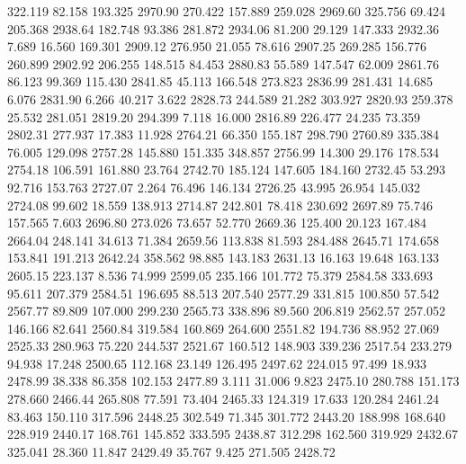  322.119   82.158  193.325      2970.90
 270.422  157.889  259.028      2969.60
 325.756   69.424  205.368      2938.64
 182.748   93.386  281.872      2934.06
  81.200   29.129  147.333      2932.36
   7.689   16.560  169.301      2909.12
 276.950   21.055   78.616      2907.25
 269.285  156.776  260.899      2902.92
 206.255  148.515   84.453      2880.83
  55.589  147.547   62.009      2861.76
  86.123   99.369  115.430      2841.85
  45.113  166.548  273.823      2836.99
 281.431   14.685    6.076      2831.90
   6.266   40.217    3.622      2828.73
 244.589   21.282  303.927      2820.93
 259.378   25.532  281.051      2819.20
 294.399    7.118   16.000      2816.89
 226.477   24.235   73.359      2802.31
 277.937   17.383   11.928      2764.21
  66.350  155.187  298.790      2760.89
 335.384   76.005  129.098      2757.28
 145.880  151.335  348.857      2756.99
  14.300   29.176  178.534      2754.18
 106.591  161.880   23.764      2742.70
 185.124  147.605  184.160      2732.45
  53.293   92.716  153.763      2727.07
   2.264   76.496  146.134      2726.25
  43.995   26.954  145.032      2724.08
  99.602   18.559  138.913      2714.87
 242.801   78.418  230.692      2697.89
  75.746  157.565    7.603      2696.80
 273.026   73.657   52.770      2669.36
 125.400   20.123  167.484      2664.04
 248.141   34.613   71.384      2659.56
 113.838   81.593  284.488      2645.71
 174.658  153.841  191.213      2642.24
 358.562   98.885  143.183      2631.13
  16.163   19.648  163.133      2605.15
 223.137    8.536   74.999      2599.05
 235.166  101.772   75.379      2584.58
 333.693   95.611  207.379      2584.51
 196.695   88.513  207.540      2577.29
 331.815  100.850   57.542      2567.77
  89.809  107.000  299.230      2565.73
 338.896   89.560  206.819      2562.57
 257.052  146.166   82.641      2560.84
 319.584  160.869  264.600      2551.82
 194.736   88.952   27.069      2525.33
 280.963   75.220  244.537      2521.67
 160.512  148.903  339.236      2517.54
 233.279   94.938   17.248      2500.65
 112.168   23.149  126.495      2497.62
 224.015   97.499   18.933      2478.99
  38.338   86.358  102.153      2477.89
   3.111   31.006    9.823      2475.10
 280.788  151.173  278.660      2466.44
 265.808   77.591   73.404      2465.33
 124.319   17.633  120.284      2461.24
  83.463  150.110  317.596      2448.25
 302.549   71.345  301.772      2443.20
 188.998  168.640  228.919      2440.17
 168.761  145.852  333.595      2438.87
 312.298  162.560  319.929      2432.67
 325.041   28.360   11.847      2429.49
  35.767    9.425  271.505      2428.72
